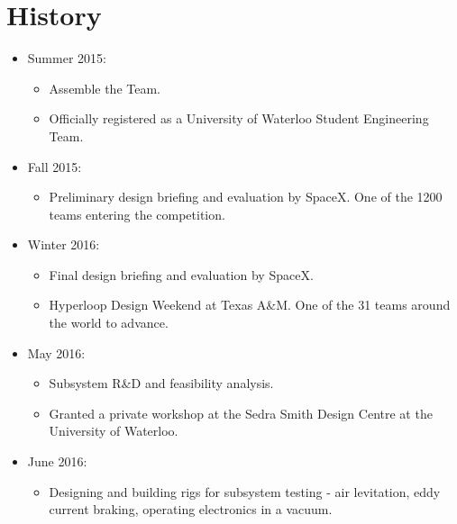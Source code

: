 \documentclass[11pt,a4paper,oldfontcommands]{memoir}
\begin{document}
   \section{History}
   \begin{itemize}

           \item Summer 2015:
	       \begin{itemize}
	               \item Assemble the Team.
		               \item Officially registered as a University of Waterloo Student Engineering Team.
			           \end{itemize}

				           \item Fall 2015:
					       \begin{itemize}
					               \item Preliminary design briefing and evaluation by SpaceX. One of the 1200 teams entering the competition.
						           \end{itemize}

							           \item Winter 2016:
								       \begin{itemize}
								               \item Final design briefing and evaluation by SpaceX.
									               \item Hyperloop Design Weekend at Texas A\&M. One of the 31 teams around the world to advance.
										           \end{itemize}

											           \item May 2016:
												       \begin{itemize}
												               \item Subsystem R\&D and feasibility analysis.
													               \item Granted a private workshop at the Sedra Smith Design Centre at the University of Waterloo.
														           \end{itemize}

															           \item June 2016:
																       \begin{itemize}
																               \item Designing and building rigs for subsystem testing - air levitation, eddy current braking, operating electronics in a vacuum.
																	           \end{itemize}


\end{itemize}
\end{document}
